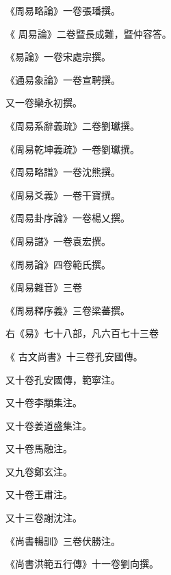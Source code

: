 \begin{pinyinscope}
 《周易略論》一卷張璠撰。



 《
 周易論》二卷暨長成難，暨仲容答。



 《易論》一卷宋處宗撰。



 《通易象論》一卷宣聘撰。



 又一卷欒永初撰。



 《周易系辭義疏》二卷劉瓛撰。



 《周易乾坤義疏》一卷劉瓛撰。



 《周易略譜》一卷沈熊撰。



 《周易爻義》一卷干寶撰。



 《周易卦序論》一卷楊乂撰。



 《周易譜》一卷袁宏撰。



 《周易論》四卷範氏撰。



 《周易雜音》三卷



 《周易釋序義》三卷梁蕃撰。



 右《易》七十八部，凡六百七十三卷



 《
 古文尚書》十三卷孔安國傳。



 又十卷孔安國傳，範寧注。



 又十卷李顒集注。



 又十卷姜道盛集注。



 又十卷馬融注。



 又九卷鄭玄注。



 又十卷王肅注。



 又十三卷謝沈注。



 《尚書暢訓》三卷伏勝注。



 《尚書洪範五行傳》十一卷劉向撰。




\end{pinyinscope}
